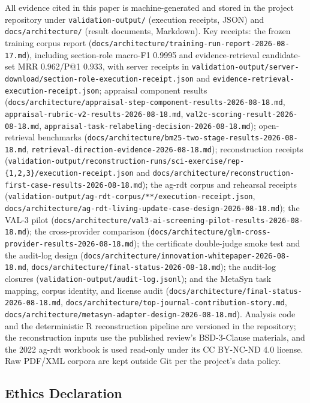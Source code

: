 \documentclass[
]{article}
\begin{document}
All evidence cited in this paper is machine-generated and stored in the
project repository under \texttt{validation-output/} (execution
receipts, JSON) and \texttt{docs/architecture/} (result documents,
Markdown). Key receipts: the frozen training corpus report
(\texttt{docs/architecture/training-run-report-2026-08-17.md}),
including section-role macro-F1 0.9995 and evidence-retrieval
candidate-set MRR 0.962/P@1 0.933, with server receipts in
\texttt{validation-output/server-download/section-role-execution-receipt.json}
and \texttt{evidence-retrieval-execution-receipt.json}; appraisal
component results
(\texttt{docs/architecture/appraisal-step-component-results-2026-08-18.md},
\texttt{appraisal-rubric-v2-results-2026-08-18.md},
\texttt{val2c-scoring-result-2026-08-18.md},
\texttt{appraisal-task-relabeling-decision-2026-08-18.md});
open-retrieval benchmarks
(\texttt{docs/architecture/bm25-two-stage-results-2026-08-18.md},
\texttt{retrieval-direction-evidence-2026-08-18.md}); reconstruction
receipts
(\texttt{validation-output/reconstruction-runs/sci-exercise/rep-\{1,2,3\}/execution-receipt.json}
and
\texttt{docs/architecture/reconstruction-first-case-results-2026-08-18.md});
the ag-rdt corpus and rehearsal receipts
(\texttt{validation-output/ag-rdt-corpus/**/execution-receipt.json},
\texttt{docs/architecture/ag-rdt-living-update-case-design-2026-08-18.md});
the VAL-3 pilot
(\texttt{docs/architecture/val3-ai-screening-pilot-results-2026-08-18.md});
the cross-provider comparison
(\texttt{docs/architecture/glm-cross-provider-results-2026-08-18.md});
the certificate double-judge smoke test and the audit-log design
(\texttt{docs/architecture/innovation-whitepaper-2026-08-18.md},
\texttt{docs/architecture/final-status-2026-08-18.md}); the audit-log
closures (\texttt{validation-output/audit-log.jsonl}); and the MetaSyn
task mapping, corpus identity, and license audit
(\texttt{docs/architecture/final-status-2026-08-18.md},
\texttt{docs/architecture/top-journal-contribution-story.md},
\texttt{docs/architecture/metasyn-adapter-design-2026-08-18.md}).
Analysis code and the deterministic R reconstruction pipeline are
versioned in the repository; the reconstruction inputs use the published
review's BSD-3-Clause materials, and the 2022 ag-rdt workbook is used
read-only under its CC BY-NC-ND 4.0 license. Raw PDF/XML corpora are
kept outside Git per the project's data policy.

\subsection{Ethics Declaration}\label{ethics-declaration}
\end{document}
